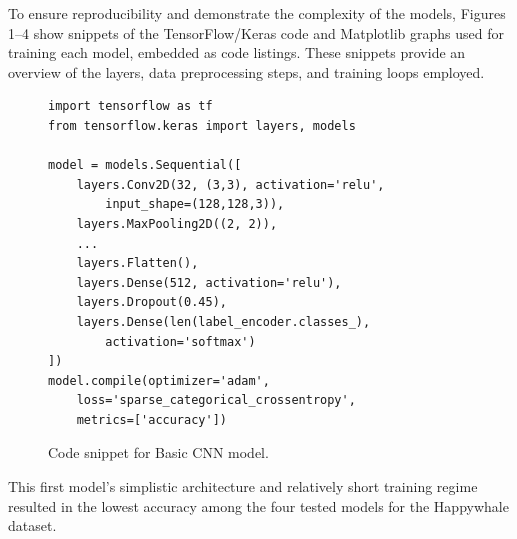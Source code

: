 \documentclass[twocolumn]{article}
\begin{document}
To ensure reproducibility and demonstrate the complexity of the models, Figures 1–4 show snippets of the TensorFlow/Keras code and Matplotlib graphs used for training each model, embedded as code listings. These snippets provide an overview of the layers, data preprocessing steps, and training loops employed.

\lstset{
    language=Python,
    basicstyle=\footnotesize\ttfamily,
    breaklines=true,
    columns=fullflexible,
    frame=single
}

\begin{figure}[H]
\centering
\begin{minipage}{0.95\linewidth}
\begin{lstlisting}
import tensorflow as tf
from tensorflow.keras import layers, models

model = models.Sequential([
    layers.Conv2D(32, (3,3), activation='relu',
        input_shape=(128,128,3)),
    layers.MaxPooling2D((2, 2)),
    ...
    layers.Flatten(),
    layers.Dense(512, activation='relu'),
    layers.Dropout(0.45),
    layers.Dense(len(label_encoder.classes_),
        activation='softmax')
])
model.compile(optimizer='adam', 
    loss='sparse_categorical_crossentropy', 
    metrics=['accuracy'])
\end{lstlisting}
\end{minipage}
\caption{Code snippet for Basic CNN model.}
\label{fig:model1}
\end{figure}

This first model’s simplistic architecture and relatively short training regime resulted in the lowest accuracy among the four tested models for the Happywhale dataset.
\end{document}
